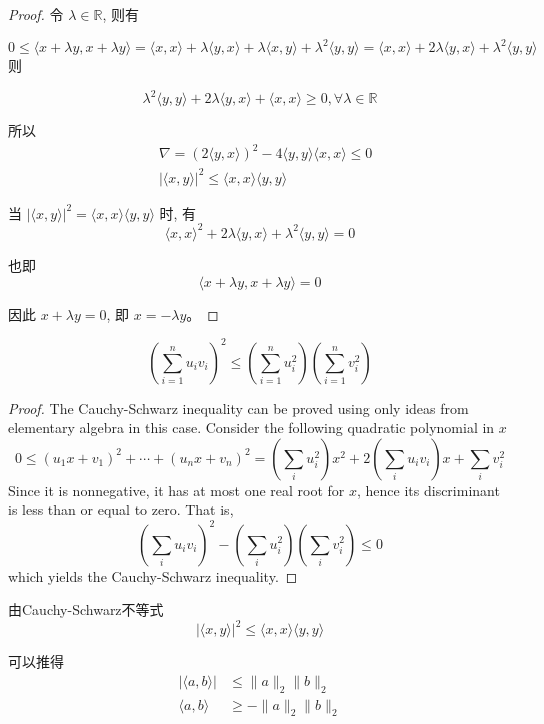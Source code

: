 \begin{proof}
    令 $\lambda \in \mathbb{R}$, 则有 
    
    $$0 \leq\langle x+\lambda y, x+\lambda y\rangle=\langle x, x\rangle+\lambda\langle y, x\rangle+\lambda\langle x, y\rangle+\lambda^{2}\langle y, y\rangle=\langle x, x\rangle+2 \lambda\langle y, x\rangle+\lambda^{2}\langle y, y\rangle$$
则 

$$\lambda^{2}\langle y, y\rangle+2 \lambda\langle y, x\rangle+\langle x, x\rangle \geq 0, \forall \lambda \in \mathbb{R}$$

所以
$$
\begin{aligned}
&\nabla=(2\langle y, x\rangle)^{2}-4\langle y, y\rangle\langle x, x\rangle \leq 0 \\
&|\langle x, y\rangle|^{2} \leq\langle x, x\rangle\langle y, y\rangle
\end{aligned}
$$

当 $|\langle x, y\rangle|^{2}=\langle x, x\rangle\langle y, y\rangle$ 时, 有 $$\langle x, x\rangle^{2}+2 \lambda\langle y, x\rangle+\lambda^{2}\langle y, y\rangle=0$$

也即 $$\langle x+\lambda y, x+\lambda y\rangle=0$$

因此 $x+\lambda y=0$, 即 $x=-\lambda y$。
\end{proof}

\begin{theorem}

    $$\left(\sum_{i=1}^{n} u_{i} v_{i}\right)^{2} \leq\left(\sum_{i=1}^{n} u_{i}^{2}\right)\left(\sum_{i=1}^{n} v_{i}^{2}\right)$$
\end{theorem}

\begin{proof}
    The Cauchy-Schwarz inequality can be proved using only ideas from elementary algebra in this case. Consider the following quadratic polynomial in $x$
$$
0 \leq\left(u_{1} x+v_{1}\right)^{2}+\cdots+\left(u_{n} x+v_{n}\right)^{2}=\left(\sum_{i} u_{i}^{2}\right) x^{2}+2\left(\sum_{i} u_{i} v_{i}\right) x+\sum_{i} v_{i}^{2}
$$
Since it is nonnegative, it has at most one real root for $x$, hence its discriminant is less than or equal to zero. That is,
$$
\left(\sum_{i} u_{i} v_{i}\right)^{2}-\left(\sum_{i} u_{i}^{2}\right)\left(\sum_{i} v_{i}^{2}\right) \leq 0
$$
which yields the Cauchy-Schwarz inequality.
\end{proof}

\begin{corollary}
    由Cauchy-Schwarz不等式
    $$
    |\langle x, y\rangle|^{2} \leq\langle x, x\rangle\langle y, y\rangle
    $$

    可以推得
    $$\begin{aligned}
        |\langle a,b \rangle| &\le \| a \|_2 \| b \|_2\\
        \langle a,b \rangle &\ge -\| a \|_2 \| b \|_2
    \end{aligned} $$
\end{corollary}

